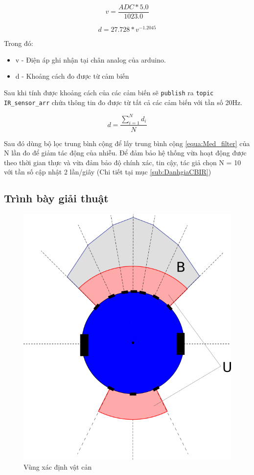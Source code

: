 \begin{equation}
    v = \frac{ADC * 5.0}{1023.0}
    \label{equa:ADC2Vol}
\end{equation}

\begin{equation}
    d = 27.728 * {v}^{-1.2045}
    \label{equa:Vol2Distance}
\end{equation}

Trong đó:
\begin{itemize}
    \item v - Điện áp ghi nhận tại chân analog của arduino.
    \item d - Khoảng cách đo được từ cảm biến
\end{itemize}

Sau khi tính được khoảng cách của các cảm biến sẽ {\tt publish} ra {\tt topic IR\_sensor\_arr} chứa thông tin đo được từ tất cả các cảm biến với tần số 20Hz.

\begin{equation}
    d = \frac{\sum_{i=1}^{N} d_i}{N}
    \label{equa:Med_filter}
\end{equation}

Sau đó dùng bộ lọc trung bình cộng để lấy trung bình cộng \ref{equa:Med_filter} của N lần đo để giảm tác động của nhiễu. Để đảm bảo hệ thống vừa hoạt động được theo thời gian thực và vừa đảm bảo độ chính xác, tin cậy, tác giả chọn N = 10 với tần số cập nhật 2 lần/giây (Chi tiết tại mục \ref{sub:DanhgiaCBIR})

\subsection{Trình bày giải thuật} \label{sub:IR-algorithm}

\begin{figure}[htbp]
    \centering
    \includegraphics[width=0.5\linewidth]{figures/arg_obstacle-detection-area.png}
    \caption{Vùng xác định vật cản}
    \label{fig:arg-obstacle-area}
\end{figure}

